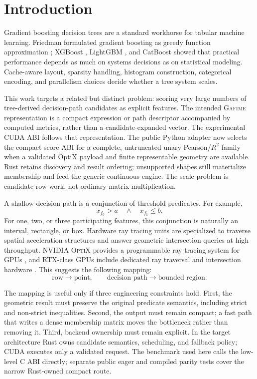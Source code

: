 \documentclass[11pt]{article}
\newcommand{\gafime}{\textsc{Gafime}\xspace}
\newcommand{\cuda}{\textsc{CUDA}\xspace}
\newcommand{\optix}{\textsc{OptiX}\xspace}
\begin{document}
\section{Introduction}

Gradient boosting decision trees are a standard workhorse for tabular machine
learning. Friedman formulated gradient boosting as greedy function
approximation \cite{friedman2001greedy}; XGBoost \cite{chen2016xgboost},
LightGBM \cite{ke2017lightgbm}, and CatBoost
\cite{prokhorenkova2018catboost} showed that practical performance depends as
much on systems decisions as on statistical modeling. Cache-aware layout,
sparsity handling, histogram construction, categorical encoding, and
parallelism choices decide whether a tree system scales.

This work targets a related but distinct problem: scoring very large numbers of
tree-derived decision-path candidates as explicit features. The intended
\gafime representation is a compact expression or path descriptor accompanied
by computed metrics, rather than a candidate-expanded vector. The experimental
CUDA ABI follows that representation. The public Python adapter now selects the
compact score ABI for a complete, untruncated unary Pearson/$R^2$ family when a
validated OptiX payload and finite representable geometry are available. Rust
retains discovery and result ordering; unsupported shapes still materialize
membership and feed the generic continuous engine. The scale problem is
candidate-row work, not ordinary matrix multiplication.

A shallow decision path is a conjunction of threshold predicates. For example,
\[
  x_{f_0} > a \quad \wedge \quad x_{f_1} \le b .
\]
For one, two, or three participating features, this conjunction is naturally an
interval, rectangle, or box. Hardware ray tracing units are specialized to
traverse spatial acceleration structures and answer geometric intersection
queries at high throughput. NVIDIA \optix provides a programmable ray tracing
system for GPUs \cite{parker2010optix}, and RTX-class GPUs include dedicated
ray traversal and intersection hardware \cite{nvidia2018turing}. This suggests
the following mapping:
\[
  \text{row} \longrightarrow \text{point}, \qquad
  \text{decision path} \longrightarrow \text{bounded region}.
\]

The mapping is useful only if three engineering constraints hold. First, the
geometric result must preserve the original predicate semantics, including
strict and non-strict inequalities. Second, the output must remain compact; a
fast path that writes a dense membership matrix moves the bottleneck rather
than removing it. Third, backend ownership must remain explicit. In the target
architecture Rust owns candidate semantics, scheduling, and fallback policy;
\cuda executes only a validated request. The benchmark used here calls the
low-level C ABI directly; separate public eager and compiled parity tests cover
the narrow Rust-owned compact route.
\end{document}

